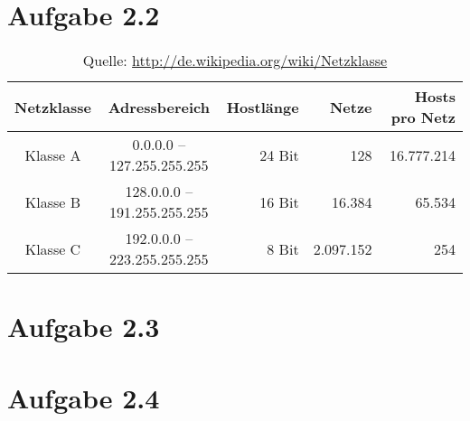\documentclass[german,12pt,a4paper]{article}
\begin{document}
\section*{Aufgabe 2.2}
\begin{table}[h]
\begin{tabular}{|c|c|r|r|r|}\hline
Netzklasse & Adressbereich               & Hostlänge & Netze      & Hosts pro Netz \\\hline
Klasse A   &   0.0.0.0 – 127.255.255.255 & 24 Bit    &	      128	& 16.777.214     \\
Klasse B   & 128.0.0.0 – 191.255.255.255 & 16 Bit    &	   16.384 &	    65.534     \\
Klasse C   & 192.0.0.0 – 223.255.255.255 & 	8 Bit    &	2.097.152	&        254     \\\hline
\end{tabular}
\caption{Quelle: \url{http://de.wikipedia.org/wiki/Netzklasse}}
\end{table}


\section*{Aufgabe 2.3}

\section*{Aufgabe 2.4}
\end{document}
